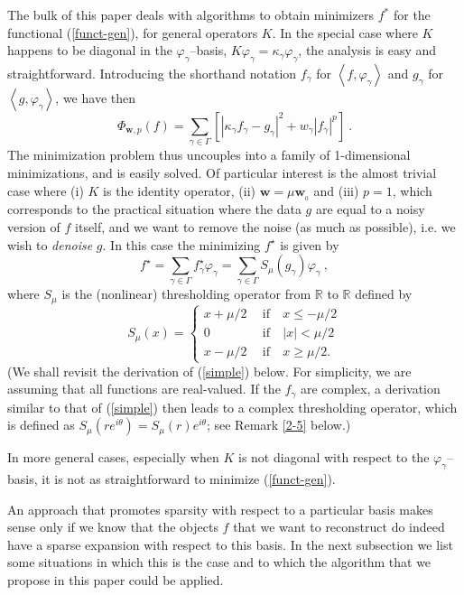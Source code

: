 \documentclass[10pt]{article}
\def\R{\mathbb{R}}
\def\fg{f_{\gamma}}
\def\ag{w_{\gamma}}
\def\vpg{\varphi_{\gamma}}
\def\g{\gamma}
\newcommand\eref[1]{(\ref{#1})}
\begin{document}
The bulk of this paper deals with  algorithms to obtain minimizers $f^*$
for the
functional
\eref{funct-gen}, for general operators $K$. In the special case where $K$
happens
to be diagonal in the $\vpg$--basis,
$K \vpg= \kappa_{\g} \vpg$,
the analysis is easy and straightforward.
Introducing the shorthand notation $\fg$ for $\left<f,\vpg\right>$ and
$g_{\gamma}$ for
$\left<g,\vpg\right>$, we have then
$$
\Phi_{\mathbf{w},p}(f)=
\sum_{\gamma \in \Gamma} \left[ |\kappa_{\g} \fg-g_{\gamma}|^2
+ \ag |\fg|^p\right] ~.
$$
The minimization problem thus uncouples into a family of 1-dimensional
minimizations, and is
easily solved. Of particular interest is the almost trivial case where
(i) $K$ is the identity operator,
(ii) $\mathbf{w}=\mu \mathbf{w}_{_0}$ and (iii) $p=1$,
which corresponds to the practical situation where
the data $g$ are equal to a noisy version of $f$ itself, and we want to remove
the noise
(as much as possible), i.e. we wish to {\em denoise} $g$. In this case the
minimizing $f^\star$ is given by
\begin{equation}
\label{simple}
f^\star = \sum_{\gamma \in \Gamma} f^\star_{\g} \vpg
= \sum_{\gamma \in \Gamma} S_{\mu}(g_{\gamma}) \vpg~,
\end{equation}
where $S_{\mu}$ is the (nonlinear) thresholding operator from $\R$ to $\R$
defined by
\begin{equation}
\label{stau}
S_{\mu}(x)= \left\{
 \begin{array}{ccl} x +\mu/2 ~&~ \mbox{if} ~& x \leq - \mu/2  \\
0 ~&~ \mbox{if} ~& |x| < \mu/2
\\ x- \mu/2 ~&~ \mbox{if} ~& x \geq  \mu/2.
\end{array} \right.
\end{equation}
(We shall revisit the derivation of \eref{simple} below. For simplicity,
we are assuming that all functions are real-valued. If the $\fg$ are complex,
a derivation similar
to that of \eref{simple} then leads to a complex thresholding operator, which
is defined as $S_{\mu}(r e^{i\theta})= S_{\mu}(r) e^{i\theta}$;
see Remark \ref{2-5} below.)

In more general cases, especially when $K$ is not diagonal with respect
to the $\vpg$--basis, it is not as straightforward to minimize
\eref{funct-gen}.

An approach that promotes sparsity with respect to a particular basis
makes sense only if we know that the objects $f$ that we want
to reconstruct do indeed have a sparse expansion with respect to this basis.
In the next subsection we list some situations in which this is the
case and to which the algorithm that we propose in this paper
could be applied.
\end{document}
